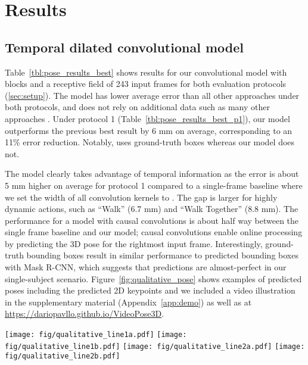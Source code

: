 \documentclass[10pt,twocolumn,letterpaper]{article}
\begin{document}
\section{Results}
\label{sec:pose_results}

\subsection{Temporal dilated convolutional model}

Table~\ref{tbl:pose_results_best} shows results for our convolutional model with  blocks and a receptive field of 243 input frames for both evaluation protocols (\textsection\ref{sec:setup}).
The model has lower average error than all other approaches under both protocols, and does not rely on additional data such as many other approaches .
Under protocol 1 (Table~\ref{tbl:pose_results_best_p1}), our model outperforms the previous best result \cite{lee:propagating:2018} by 6 mm on average, corresponding to an 11\% error reduction. 
Notably, \cite{lee:propagating:2018} uses ground-truth boxes whereas our model does not.

The model clearly takes advantage of temporal information as the error is about 5 mm higher on average for protocol 1 compared to a single-frame baseline where we set the width of all convolution kernels to . 
The gap is larger for highly dynamic actions, such as ``Walk'' (6.7 mm) and ``Walk Together'' (8.8 mm).
The performance for a model with causal convolutions is about half way between the single frame baseline and our model; causal convolutions enable online processing by predicting the 3D pose for the rightmost input frame. 
Interestingly, ground-truth bounding boxes result in similar performance to predicted bounding boxes with Mask R-CNN, which suggests that predictions are almost-perfect in our single-subject scenario.
Figure~\ref{fig:qualitative_pose} shows examples of predicted poses including the predicted 2D keypoints and we included a video illustration in the supplementary material (Appendix~\ref{app:demo}) as well as at \url{https://dariopavllo.github.io/VideoPose3D}.



\begin{figure*}
	\centering
	\texttt{[image: fig/qualitative\_line1a.pdf]}\quad
	\texttt{[image: fig/qualitative\_line1b.pdf]}
	\texttt{[image: fig/qualitative\_line2a.pdf]}\quad
	\texttt{[image: fig/qualitative\_line2b.pdf]}
    
	\caption{Qualitative results for two videos. \textbf{Top:} video frames with 2D pose overlay. \textbf{Bottom:} 3D reconstruction.}
	\label{fig:qualitative_pose}
\end{figure*}
\end{document}
